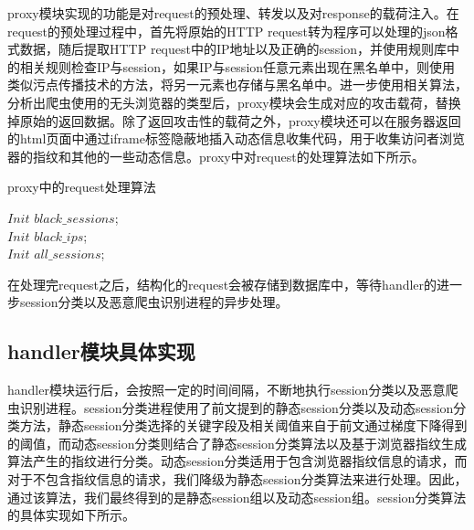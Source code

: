 \documentclass[doctor,privacy,twoside]{buaa_mac}
\begin{document}
proxy模块实现的功能是对request的预处理、转发以及对response的载荷注入。在request的预处理过程中，首先将原始的HTTP request转为程序可以处理的json格式数据，随后提取HTTP request中的IP地址以及正确的session，并使用规则库中的相关规则检查IP与session，如果IP与session任意元素出现在黑名单中，则使用类似污点传播技术的方法，将另一元素也存储与黑名单中。进一步使用相关算法，分析出爬虫使用的无头浏览器的类型后，proxy模块会生成对应的攻击载荷，替换掉原始的返回数据。除了返回攻击性的载荷之外，proxy模块还可以在服务器返回的html页面中通过iframe标签隐蔽地插入动态信息收集代码，用于收集访问者浏览器的指纹和其他的一些动态信息。proxy中对request的处理算法如下所示。

\begin{algorithm}[!h]
  \caption{proxy中的request处理算法}

  $Init$ $black\_{}sessions$;\\
  $Init$ $black\_{}ips$; \\
  $Init$ $all\_{}sessions$;\\  
  
 

\end{algorithm}


在处理完request之后，结构化的request会被存储到数据库中，等待handler的进一步session分类以及恶意爬虫识别进程的异步处理。

\subsection{handler模块具体实现}
handler模块运行后，会按照一定的时间间隔，不断地执行session分类以及恶意爬虫识别进程。session分类进程使用了前文提到的静态session分类以及动态session分类方法，静态session分类选择的关键字段及相关阈值来自于前文通过梯度下降得到的阈值，而动态session分类则结合了静态session分类算法以及基于浏览器指纹生成算法产生的指纹进行分类。动态session分类适用于包含浏览器指纹信息的请求，而对于不包含指纹信息的请求，我们降级为静态session分类算法来进行处理。因此，通过该算法，我们最终得到的是静态session组以及动态session组。session分类算法的具体实现如下所示。
\end{document}
